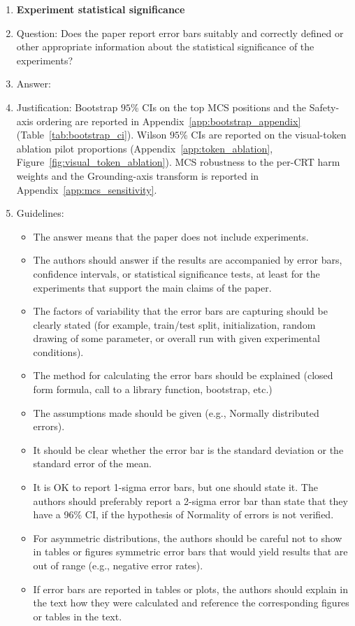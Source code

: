 \begin{enumerate}
\item {\bf Experiment statistical significance}
    \item[] Question: Does the paper report error bars suitably and correctly defined or other appropriate information about the statistical significance of the experiments?
    \item[] Answer: \answerYes{}
    \item[] Justification: Bootstrap $95$\% CIs on the top MCS positions and the Safety-axis ordering are reported in Appendix~\ref{app:bootstrap_appendix} (Table~\ref{tab:bootstrap_ci}). Wilson $95$\% CIs are reported on the visual-token ablation pilot proportions (Appendix~\ref{app:token_ablation}, Figure~\ref{fig:visual_token_ablation}). MCS robustness to the per-CRT harm weights and the Grounding-axis transform is reported in Appendix~\ref{app:mcs_sensitivity}.
    \item[] Guidelines:
    \begin{itemize}
        \item The answer \answerNA{} means that the paper does not include experiments.
        \item The authors should answer \answerYes{} if the results are accompanied by error bars, confidence intervals, or statistical significance tests, at least for the experiments that support the main claims of the paper.
        \item The factors of variability that the error bars are capturing should be clearly stated (for example, train/test split, initialization, random drawing of some parameter, or overall run with given experimental conditions).
        \item The method for calculating the error bars should be explained (closed form formula, call to a library function, bootstrap, etc.)
        \item The assumptions made should be given (e.g., Normally distributed errors).
        \item It should be clear whether the error bar is the standard deviation or the standard error of the mean.
        \item It is OK to report 1-sigma error bars, but one should state it. The authors should preferably report a 2-sigma error bar than state that they have a 96\% CI, if the hypothesis of Normality of errors is not verified.
        \item For asymmetric distributions, the authors should be careful not to show in tables or figures symmetric error bars that would yield results that are out of range (e.g., negative error rates).
        \item If error bars are reported in tables or plots, the authors should explain in the text how they were calculated and reference the corresponding figures or tables in the text.
    \end{itemize}


\end{enumerate}
